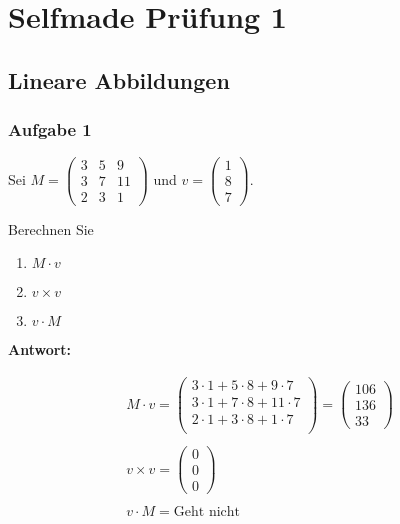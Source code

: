 \chapter{Selfmade Prüfung 1}

\section{Lineare Abbildungen}

\subsection{Aufgabe 1}

Sei $M = \begin{pmatrix}
        3 & 5 & 9  \\
        3 & 7 & 11 \\
        2 & 3 & 1
    \end{pmatrix}$ und $v = \begin{pmatrix}
        1 \\ 8 \\ 7
    \end{pmatrix}$.

Berechnen Sie
\begin{enumerate}
    \item $M \cdot v$
    \item $v \times v$
    \item $v \cdot M$
\end{enumerate}

\textbf{Antwort:}

\begin{align*}
    M \cdot v = \begin{pmatrix}
                    3 \cdot 1 + 5 \cdot 8 + 9 \cdot 7  \\
                    3 \cdot 1 + 7 \cdot 8 + 11 \cdot 7 \\
                    2 \cdot 1 + 3 \cdot 8 + 1 \cdot 7  \\
                \end{pmatrix} = \begin{pmatrix}
                                    106 \\ 136 \\ 33
                                \end{pmatrix} \\\\
    v \times v = \begin{pmatrix}
                     0 \\ 0 \\ 0
                 \end{pmatrix}                    \\\\
    v \cdot M = \text{Geht nicht}
\end{align*}

